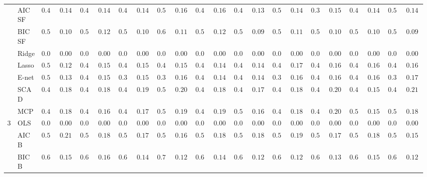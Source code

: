 \begin{tabular}{ll|ll|llllll|llllll|llllll}
 & AIC SF  & $0.416$ & $0.1441$ & $0.440$ & $0.1477$ & $0.448$ & $0.1453$ & $0.528$ & $0.1621$ & $0.406$ & $0.1693$ & $0.468$ & $0.1309$ & $0.504$ & $0.1406$ & $0.394$ & $0.1594$ & $0.460$ & $0.1435$ & $0.508$ & $0.1433$ \\
 & BIC SF  & $0.512$ & $0.1076$ & $0.514$ & $0.1247$ & $0.522$ & $0.1060$ & $0.606$ & $0.1153$ & $0.504$ & $0.1222$ & $0.542$ & $0.0997$ & $0.562$ & $0.1126$ & $0.524$ & $0.1093$ & $0.538$ & $0.1013$ & $0.586$ & $0.0995$ \\
 & Ridge  & $0.000$ & $0.0000$ & $0.000$ & $0.0000$ & $0.000$ & $0.0000$ & $0.000$ & $0.0000$ & $0.000$ & $0.0000$ & $0.000$ & $0.0000$ & $0.000$ & $0.0000$ & $0.000$ & $0.0000$ & $0.000$ & $0.0000$ & $0.000$ & $0.0000$ \\
 & Lasso  & $0.512$ & $0.1249$ & $0.476$ & $0.1525$ & $0.430$ & $0.1541$ & $0.412$ & $0.1552$ & $0.490$ & $0.1432$ & $0.478$ & $0.1418$ & $0.420$ & $0.1717$ & $0.476$ & $0.1628$ & $0.454$ & $0.1629$ & $0.428$ & $0.1682$ \\
 & E-net  & $0.500$ & $0.1348$ & $0.462$ & $0.1575$ & $0.396$ & $0.1504$ & $0.324$ & $0.1628$ & $0.476$ & $0.1498$ & $0.460$ & $0.1435$ & $0.352$ & $0.1611$ & $0.464$ & $0.1630$ & $0.434$ & $0.1609$ & $0.372$ & $0.1776$ \\
 & SCAD  & $0.410$ & $0.1872$ & $0.424$ & $0.1870$ & $0.434$ & $0.1908$ & $0.548$ & $0.2082$ & $0.416$ & $0.1879$ & $0.478$ & $0.1727$ & $0.492$ & $0.1830$ & $0.416$ & $0.2063$ & $0.496$ & $0.1595$ & $0.472$ & $0.2118$ \\
 & MCP  & $0.450$ & $0.1829$ & $0.496$ & $0.1669$ & $0.474$ & $0.1790$ & $0.542$ & $0.1996$ & $0.460$ & $0.1959$ & $0.512$ & $0.1641$ & $0.470$ & $0.1829$ & $0.464$ & $0.2087$ & $0.524$ & $0.1525$ & $0.512$ & $0.1849$ \\\hline
3 & OLS  & $0.000$ & $0.0000$ & $0.000$ & $0.0000$ & $0.000$ & $0.0000$ & $0.000$ & $0.0000$ & $0.000$ & $0.0000$ & $0.000$ & $0.0000$ & $0.000$ & $0.0000$ & $0.000$ & $0.0000$ & $0.000$ & $0.0000$ & $0.000$ & $0.0000$ \\
 & AIC B  & $0.500$ & $0.2118$ & $0.524$ & $0.1881$ & $0.546$ & $0.1702$ & $0.598$ & $0.1645$ & $0.538$ & $0.1857$ & $0.560$ & $0.1886$ & $0.550$ & $0.1977$ & $0.572$ & $0.1753$ & $0.542$ & $0.1827$ & $0.582$ & $0.1559$ \\
 & BIC B  & $0.658$ & $0.1512$ & $0.634$ & $0.1609$ & $0.656$ & $0.1479$ & $0.702$ & $0.1223$ & $0.686$ & $0.1429$ & $0.694$ & $0.1286$ & $0.666$ & $0.1241$ & $0.682$ & $0.1306$ & $0.658$ & $0.1590$ & $0.668$ & $0.1278$ \\

\end{tabular}
